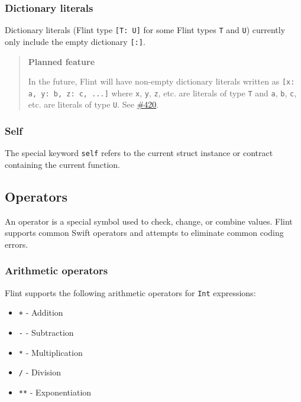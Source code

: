 \subsubsection{Dictionary literals}
\label{sec:appendix-b-dictionary-literals}

Dictionary literals (Flint type \texttt{[T: U]} for some Flint types \texttt{T} and \texttt{U}) currently only include the empty dictionary \texttt{[:]}.

\begin{quote}
\textbf{Planned feature}

In the future, Flint will have non-empty dictionary literals written as \texttt{[x: a, y: b, z: c, ...]} where \texttt{x}, \texttt{y}, \texttt{z}, etc. are literals of type \texttt{T} and \texttt{a}, \texttt{b}, \texttt{c}, etc. are literals of type \texttt{U}. See \href{https://github.com/flintlang/flint/issues/420}{\#420}.
\end{quote}

\subsubsection{Self}
\label{sec:appendix-b-self}

The special keyword \texttt{self} refers to the current struct instance or contract containing the current function.

\subsection{Operators}
\label{sec:appendix-b-operators}

An operator is a special symbol used to check, change, or combine values. Flint supports common Swift operators and attempts to eliminate common coding errors.

\subsubsection{Arithmetic operators}
\label{sec:appendix-b-arithmetic-operators}

Flint supports the following arithmetic operators for \texttt{Int} expressions:

\begin{itemize}
	\item \texttt{+} - Addition
	\item \texttt{-} - Subtraction
	\item \texttt{*} - Multiplication
	\item \texttt{/} - Division
	\item \texttt{**} - Exponentiation
\end{itemize}


